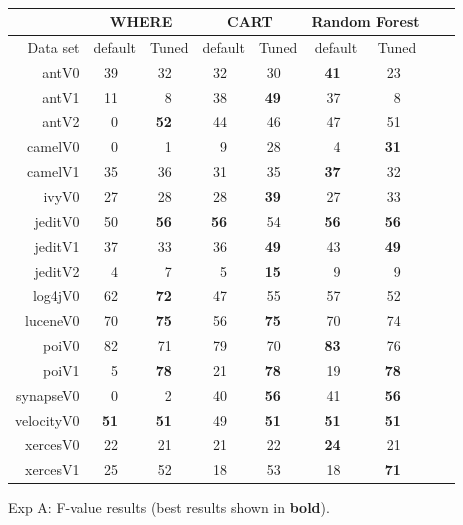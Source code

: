 \documentclass{acm_proc_article-sp}
\begin{document}
\begin{figure}[!t]
\renewcommand{\baselinestretch}{0.8} 

\scriptsize  
~~~\begin{tabular}{r|rl|rl|rl|rl|rl|rlrl}
      &   \multicolumn{4}{c|}{WHERE}         &   \multicolumn{4}{c|}{CART}         &   \multicolumn{4}{c}{Random Forest}         \\\hline
  Data set   &   \multicolumn{2}{c}{default}         &   \multicolumn{2}{c|}{Tuned}         &   \multicolumn{2}{c}{default}         &   \multicolumn{2}{c|}{Tuned}    &   \multicolumn{2}{c}{default}  &   \multicolumn{2}{c}{Tuned}\\\hline
antV0 & 39 &   & 32 &   & 32 &   & 30 &   & {\bf 41} &   & 23 &  \\
antV1 & 11 &   & 8 &   & 38 &   & {\bf 49} &   & 37 &   & 8 &  \\
antV2 & 0 &   & {\bf 52} &   & 44 &   & 46 &   & 47 &   & 51 &  \\
camelV0 & 0 &   & 1 &   & 9 &   & 28 &   & 4 &   & {\bf 31} &  \\
camelV1 & 35 &   & 36 &   & 31 &   & 35 &   & {\bf 37} &   & 32 &  \\
ivyV0 & 27 &   & 28 &   & 28 &   & {\bf 39} &   & 27 &   & 33 &  \\
jeditV0 & 50 &   & {\bf 56} &   & {\bf 56} &   & 54 &   & {\bf 56} &   & {\bf 56} &  \\
jeditV1 & 37 &   & 33 &   & 36 &   & {\bf 49} &   & 43 &   & {\bf 49} &  \\
jeditV2 & 4 &   & 7 &   & 5 &   & {\bf 15} &   & 9 &   & 9 &  \\
log4jV0 & 62 &   & {\bf 72} &   & 47 &   & 55 &   & 57 &   & 52 &  \\
luceneV0 & 70 &   & {\bf 75} &   & 56 &   & {\bf 75} &   & 70 &   & 74 &  \\
poiV0 & 82 &   & 71 &   & 79 &   & 70 &   & {\bf 83} &   & 76 &  \\
poiV1 & 5 &   & {\bf 78} &   & 21 &   & {\bf 78} &   & 19 &   & {\bf 78} &  \\
synapseV0 & 0 &   & 2 &   & 40 &   & {\bf 56} &   & 41 &   & {\bf 56} &  \\
velocityV0 & {\bf 51} &   & {\bf 51} &   & 49 &   & {\bf 51} &   & {\bf 51} &   & {\bf 51} &  \\
xercesV0 & 22 &   & 21 &   & 21 &   & 22 &   & {\bf 24} &   & 21 &  \\
xercesV1 & 25 &   & 52 &   & 18 &   & 53 &   & 18 &   & {\bf 71} &  \\



\end{tabular}
\caption{ Exp A: F-value results (best results  shown in {\bf bold}).}
\label{fig:fbars}
\end{figure}
\end{document}
